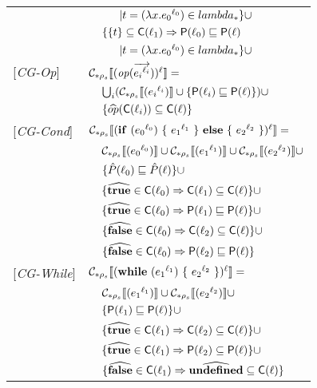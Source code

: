 \documentclass[[12pt,a4paper,twoside,openrigh]{report}
\begin{document}
\begin{tabular}{l l l l}
&&&$| t = (\lambda x.{e_0}^{\ell_0}) \in lambda_* \}\cup$\\
&& \multicolumn{2}{l}{$\{\{ t \} \subseteq \mathsf{C}(\ell_1) \Rightarrow \mathsf{P}(\ell_0) \sqsubseteq \mathsf{P}(\ell)$}\\
&&&$| t = (\lambda x.{e_0}^{\ell_0}) \in lambda_* \}\cup$\\
{[\textit{CG-Op}]}&\multicolumn{3}{l}{$ \mathcal{C}_{*\rho_s}\llbracket (\mathit{op} (\overrightarrow{{e_i}^{\ell_i}}))^\ell \rrbracket = $}\\
&&\multicolumn{2}{l}{$\bigcup_i (\mathcal{C}_{*\rho_s}\llbracket ({e_i}^{\ell_i}) \rrbracket \cup \{ \mathsf{P}(\ell_i) \sqsubseteq \mathsf{P}(\ell) \})\cup$}\\
&&\multicolumn{2}{l}{$\{ \widehat{op} (\mathsf{C}(\ell_i)) \subseteq \mathsf{C}(\ell) \}$}\\
{[\textit{CG-Cond}]}&\multicolumn{3}{l}{$\mathcal{C}_{*\rho_s}\llbracket (\mathbf{if}\ ({e_0}^{\ell_0})\ \{\ {e_1}^{\ell_1}\ \}\ \mathbf{else}\ \{\ {e_2}^{\ell_2}\ \})^\ell \rrbracket = $}\\
&&\multicolumn{2}{l}{$ \mathcal{C}_{*\rho_s}\llbracket ({e_0}^{\ell_0}) \rrbracket \cup \mathcal{C}_{*\rho_s}\llbracket ({e_1}^{\ell_1}) \rrbracket \cup \mathcal{C}_{*\rho_s}\llbracket ({e_2}^{\ell_2}) \rrbracket \cup$}\\
&&\multicolumn{2}{l}{$\{ \hat{P}(\ell_0) \sqsubseteq \hat{P}(\ell) \} \cup$} \\
&&\multicolumn{2}{l}{$\{ \widehat{\mathbf{true}} \in \mathsf{C}(\ell_0) \Rightarrow \mathsf{C}(\ell_1) \subseteq \mathsf{C}(\ell) \}\cup$}\\
&&\multicolumn{2}{l}{$\{ \widehat{\mathbf{true}} \in \mathsf{C}(\ell_0) \Rightarrow \mathsf{P}(\ell_1) \sqsubseteq \mathsf{P}(\ell) \}\cup$} \\
&&\multicolumn{2}{l}{$\{ \widehat{\mathbf{false}} \in \mathsf{C}(\ell_0) \Rightarrow \mathsf{C}(\ell_2) \subseteq \mathsf{C}(\ell) \}\cup$}\\
&&\multicolumn{2}{l}{$\{ \widehat{\mathbf{false}} \in \mathsf{C}(\ell_0) \Rightarrow \mathsf{P}(\ell_2) \sqsubseteq \mathsf{P}(\ell) \}$} \\
{[\textit{CG-While}]}&\multicolumn{3}{l}{$\mathcal{C}_{*\rho_s}\llbracket (\mathbf{while}\ ({e_1}^{\ell_1})\ \{\ {e_2}^{\ell_2}\ \})^\ell \rrbracket = $}\\
&&\multicolumn{2}{l}{$ \mathcal{C}_{*\rho_s}\llbracket ({e_1}^{\ell_1}) \rrbracket \cup \mathcal{C}_{*\rho_s}\llbracket ({e_2}^{\ell_2}) \rrbracket \cup $}\\
&&\multicolumn{2}{l}{$\{ \mathsf{P}(\ell_1) \sqsubseteq \mathsf{P}(\ell) \} \cup$} \\
&&\multicolumn{2}{l}{$\{ \widehat{\mathbf{true}} \in \mathsf{C}(\ell_1) \Rightarrow \mathsf{C}(\ell_2) \subseteq \mathsf{C}(\ell)  \}\cup$}\\
&&\multicolumn{2}{l}{$\{ \widehat{\mathbf{true}} \in \mathsf{C}(\ell_1) \Rightarrow \mathsf{P}(\ell_2) \subseteq \mathsf{P}(\ell)  \}\cup$}\\
&&\multicolumn{2}{l}{$\{ \widehat{\mathbf{false}} \in \mathsf{C}(\ell_1) \Rightarrow \widehat{\mathbf{undefined}} \subseteq \mathsf{C}(\ell) \}$}\\
\end{tabular}
\end{document}
